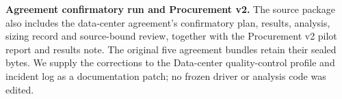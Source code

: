 \textbf{Agreement confirmatory run and Procurement v2.} The source package also includes the data-center agreement's
confirmatory plan, results, analysis, sizing record and source-bound review, together with the Procurement v2 pilot
report and results note. The original five agreement bundles retain their sealed bytes. We supply the corrections to
the Data-center quality-control profile and incident log as a documentation patch; no frozen driver or analysis code
was edited.
